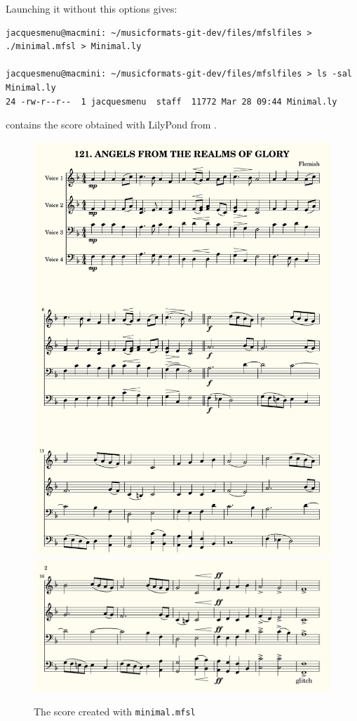Launching it without this options gives:
\begin{lstlisting}[language=Terminal]
jacquesmenu@macmini: ~/musicformats-git-dev/files/mfslfiles > ./minimal.mfsl > Minimal.ly

jacquesmenu@macmini: ~/musicformats-git-dev/files/mfslfiles > ls -sal Minimal.ly
24 -rw-r--r--  1 jacquesmenu  staff  11772 Mar 28 09:44 Minimal.ly
\end{lstlisting}

 contains the score obtained with LilyPond from .
\begin{figure}[p]
\begin{center}
\caption {The score created with {\tt minimal.mfsl}}
\label{The score created with minimal.mfsl}

\includegraphics[scale=0.5]{../graphics/Minimal_page1.png}
\includegraphics[scale=0.5]{../graphics/Minimal_page2.png}


\end{center}
\end{figure}
